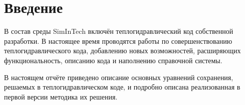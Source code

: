 
\section{Введение}
\label{sec:introduction}
В состав среды SimInTech включён теплогидравлический код собственной разработки. В настоящее время проводятся работы по совершенствованию теплогидравлического кода, добавлению новых возможностей, расширяющих функциональность, описанию кода и наполнению справочной системы.

В настоящем отчёте приведено описание основных уравнений сохранения, решаемых в теплогидравлическом коде, и подробно описана реализованная в первой версии методика их решения.

\newpage 